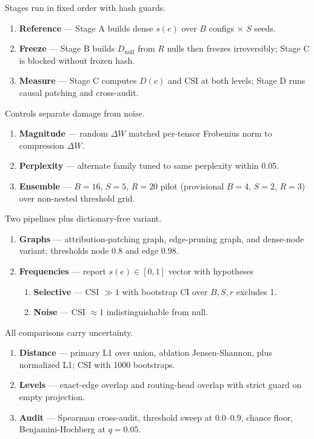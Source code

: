 \documentclass[11pt,a4paper]{article}
\makeatletter
\renewcommand\section{\@startsection{section}{1}{\z@}{-1.6ex plus -.5ex}{0.7ex plus .2ex}{\normalfont\large\bfseries}}
\makeatother
\begin{document}
\section{Methodology}
\begin{description}[style=nextline,leftmargin=0pt,labelindent=0pt,labelwidth=0pt,labelsep=0pt,itemsep=4pt,parsep=0pt,topsep=3pt]
\item[Null-first pipeline.] Stages run in fixed order with hash guards.
\begin{enumerate}
\item \textbf{Reference} --- Stage A builds dense $s(e)$ over $B$ configs $\times$ $S$ seeds.
\item \textbf{Freeze} --- Stage B builds $D_{\mathrm{null}}$ from $R$ nulls then freezes irreversibly; Stage C is blocked without frozen hash.
\item \textbf{Measure} --- Stage C computes $D(c)$ and CSI at both levels; Stage D runs causal patching and cross-audit.
\end{enumerate}
\item[Three nulls and ensemble.] Controls separate damage from noise.
\begin{enumerate}
\item \textbf{Magnitude} --- random $\Delta W$ matched per-tensor Frobenius norm to compression $\Delta W$.
\item \textbf{Perplexity} --- alternate family tuned to same perplexity within 0.05.
\item \textbf{Ensemble} --- $B{=}16$, $S{=}5$, $R{=}20$ pilot (provisional $B{=}4$, $S{=}2$, $R{=}3$) over non-nested threshold grid.
\end{enumerate}
\item[Extraction and stability.] Two pipelines plus dictionary-free variant.
\begin{enumerate}
\item \textbf{Graphs} --- attribution-patching graph, edge-pruning graph, and dense-node variant; thresholds node 0.8 and edge 0.98.
\item \textbf{Frequencies} --- report $s(e)\in[0,1]$ vector with hypotheses
\begin{enumerate}[label=(H\arabic*)]
\item \textbf{Selective} --- CSI $\gg 1$ with bootstrap CI over $B,S,r$ excludes 1.
\item \textbf{Noise} --- CSI $\approx 1$ indistinguishable from null.
\end{enumerate}
\end{enumerate}
\item[Distances, levels, and audits.] All comparisons carry uncertainty.
\begin{enumerate}
\item \textbf{Distance} --- primary L1 over union, ablation Jensen-Shannon, plus normalized L1; CSI with 1000 bootstraps.
\item \textbf{Levels} --- exact-edge overlap and routing-head overlap with strict guard on empty projection.
\item \textbf{Audit} --- Spearman cross-audit, threshold sweep at 0.0--0.9, chance floor, Benjamini-Hochberg at $q{=}0.05$.
\end{enumerate}
\end{description}
\end{document}
